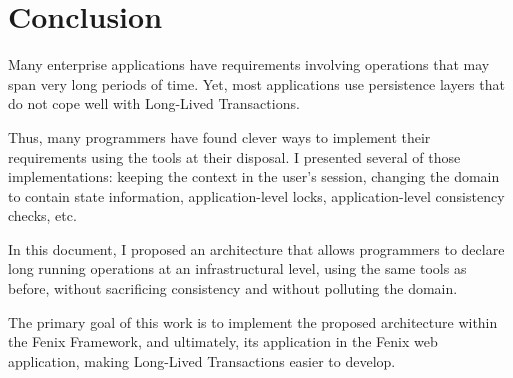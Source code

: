 \documentclass{llncs}
\begin{document}
\section{Conclusion}

Many enterprise applications have requirements involving operations
that may span very long periods of time. Yet, most applications use
persistence layers that do not cope well with Long-Lived Transactions.

Thus, many programmers have found clever ways to implement their
requirements using the tools at their disposal. I presented several of
those implementations: keeping the context in the user's session,
changing the domain to contain state information, application-level
locks, application-level consistency checks, etc.

In this document, I proposed an architecture that allows programmers
to declare long running operations at an infrastructural level, using
the same tools as before, without sacrificing consistency and without
polluting the domain.

The primary goal of this work is to implement the proposed
architecture within the Fenix Framework, and ultimately, its
application in the Fenix web application, making Long-Lived
Transactions easier to develop.

\clearpage  
\end{document}
